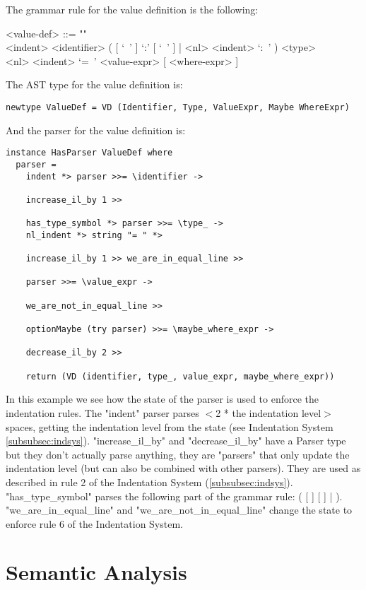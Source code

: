 \documentclass{article}
\begin{document}
The grammar rule for the value definition is the following:
\begin{grammar}
<value-def> ::= ""\\
<indent> <identifier>
( [ `\ ' ] `:' [ `\ ' ] | <nl> <indent> `:\ ' ) <type>  \\
<nl> <indent> `=\ ' <value-expr> [ <where-expr> ]
\\
\end{grammar}
The AST type for the value definition is:
\begin{verbatim}
newtype ValueDef = VD (Identifier, Type, ValueExpr, Maybe WhereExpr)

\end{verbatim}
And the parser for the value definition is:
\begin{verbatim}
instance HasParser ValueDef where
  parser =
    indent *> parser >>= \identifier ->

    increase_il_by 1 >>

    has_type_symbol *> parser >>= \type_ ->
    nl_indent *> string "= " *>

    increase_il_by 1 >> we_are_in_equal_line >>

    parser >>= \value_expr ->

    we_are_not_in_equal_line >>

    optionMaybe (try parser) >>= \maybe_where_expr ->

    decrease_il_by 2 >>

    return (VD (identifier, type_, value_expr, maybe_where_expr))

\end{verbatim}
In this example we see how the state of the parser is used to enforce the
indentation rules. The "indent" parser parses $<$2 * the indentation level$>$
spaces, getting the indentation level from the state (see Indentation System
\ref{subsubsec:indsys}).  "increase_il_by" and "decrease_il_by" have a Parser
type but they don't actually parse anything, they are "parsers" that only
update the indentation level (but can also be combined with other parsers).
They are used as described in rule 2 of the Indentation System
(\ref{subsubsec:indsys}). "has_type_symbol" parses the following part of
the grammar rule:
( [ \lit{\ } ] \lit{:} [ \lit{\ } ]
\verb|||   \lit{:\ }).
"we_are_in_equal_line" and "we_are_not_in_equal_line" change the state
to enforce rule 6 of the Indentation System.

\section{Semantic Analysis}
\end{document}
